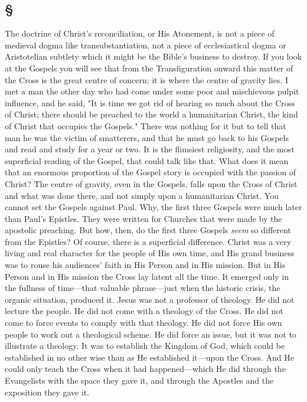 \documentclass[draft]{ptfdoc}
\begin{document}
\subsection*{
\S
}


The doctrine of Christ's reconciliation, or His 
Atonement, is not a piece of medieval dogma 
like transubstantiation, not a piece of ecclesiastical 
dogma or Aristotelian subtlety which 
it might be the Bible's business to destroy. If 
you look at the Gospels you will see that from 
the Transfiguration onward this matter of 
the Cross is the great centre of concern; it 
is where the centre of gravity lies. I met a 
man the other day who had come under some 
poor and mischievous pulpit influence, and he 
said, "It is time we got rid of hearing so much 
about the Cross of Christ; there should be 
preached to the world a humanitarian Christ, 
the kind of Christ that occupies the Gospels." 
There was nothing for it but to tell that man 
he was the victim of smatterers, and that he 
must go back to his Gospels and read and study 
for a year or two. It is the flimsiest religiosity, 
and the most superficial reading of the Gospel, 
that could talk like that. What does it mean 
that an enormous proportion of the Gospel 
story is occupied with the passion of Christ? 
The centre of gravity, even in the Gospels, falls 
upon the Cross of Christ and what was done 
there, and not simply upon a humanitarian 
Christ. You cannot set the Gospels against 
Paul. Why, the first three Gospels were much 
later than Paul's Epistles. They were written 
for Churches that were made by the apostolic 
preaching. But how, then, do the first three 
Gospels \textit{seem} so different from the Epistles? Of 
course, there is a superficial difference. Christ 
was a very living and real character for the 
people of His own time, and His grand business 
was to rouse his audiences' faith in His Person 
and in His mission. But in His Person and in 
His mission the Cross lay latent all the time. 
It emerged only in the fullness of time---that 
valuable phrase---just when the historic crisis, 
the organic situation, produced it. Jesus was 
not a professor of theology. He did not lecture 
the people. He did not come with a theology 
of the Cross. He did not come to force events 
to comply with that theology. He did not 
force His own people to work out a theological 
scheme. He did force an issue, but it 
was not to illustrate a theology. It was to 
establish the Kingdom of God, which could 
be established in no other wise than as He 
established it---upon the Cross. And He could 
only teach the Cross when it had happened---which 
He did through the Evangelists with the 
space they gave it, and through the Apostles 
and the exposition they gave it. 
\end{document}

